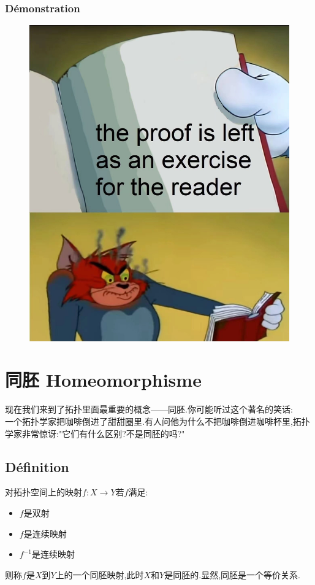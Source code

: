 \documentclass[12pt, a4paper, oneside]{ctexbook}
\begin{document}
  \subsubsection{Démonstration}
  \begin{figure}[H]%
    \centering
    \includegraphics[scale=0.2]{proofforreader.jpg}
  \end{figure}


\section{同胚 Homeomorphisme}\label{myref:tongpei}
  现在我们来到了拓扑里面最重要的概念——同胚.你可能听过这个著名的笑话:\\

  一个拓扑学家把咖啡倒进了甜甜圈里.有人问他为什么不把咖啡倒进咖啡杯里,拓扑学家非常惊讶:"它们有什么区别?不是同胚的吗?"
  \subsection{Définition}
  对拓扑空间上的映射$f:X\rightarrow Y$若$f$满足:
  \begin{itemize}
    \item $f$是双射
    \item $f$是连续映射
    \item $f^{-1}$是连续映射
  \end{itemize}
  则称$f$是$X$到$Y$上的一个同胚映射,此时$X$和$Y$是同胚的.显然,同胚是一个等价关系.
\end{document}
